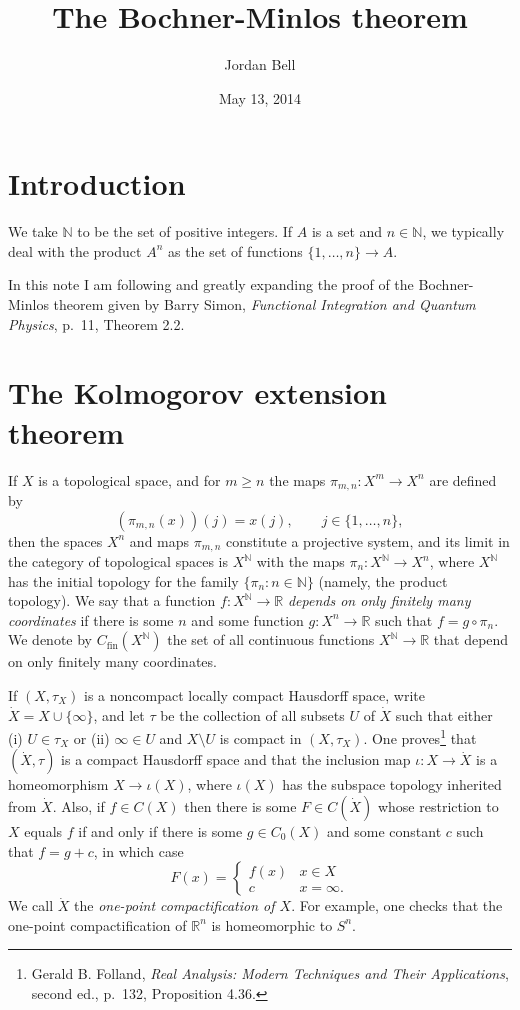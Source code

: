\documentclass{article}
\theoremstyle{definition}
\theoremstyle{definition}
\begin{document}
\title{The Bochner-Minlos theorem}
\author{Jordan Bell}
\date{May 13, 2014}

\maketitle

\section{Introduction}
We take $\mathbb{N}$ to be the set of positive integers.
 If $A$ is a set and $n \in \mathbb{N}$, we typically deal with the product $A^n$ as the set of functions $\{1,\ldots,n\} \to A$.

In this note I am following and greatly expanding the proof of the Bochner-Minlos theorem given by Barry Simon, {\em Functional Integration and Quantum Physics}, p.~11, Theorem 2.2.

\section{The Kolmogorov extension theorem}
If $X$ is a topological space,  and  for $m \geq n$ the maps $\pi_{m,n}:X^m \to X^n$ are defined by
\[
(\pi_{m,n}(x))(j)=
x(j), \qquad j \in \{1,\ldots,n\},
\]
 then the spaces
$X^n$ and maps $\pi_{m,n}$ constitute a projective system, and its  limit in the category of topological spaces is $X^\mathbb{N}$ with the maps $\pi_n:X^\mathbb{N} \to X^n$,
where $X^\mathbb{N}$ has the initial topology for the family $\{\pi_n: n \in \mathbb{N}\}$ (namely,  the product topology).
We say that a function $f:X^\mathbb{N} \to \mathbb{R}$ {\em depends on only finitely many coordinates} if there is some $n$ and some function $g:X^n \to \mathbb{R}$ such that
$f=g \circ \pi_n$. We denote by
$C_{\mathrm{fin}}(X^\mathbb{N})$ the set of all continuous functions $X^\mathbb{N} \to \mathbb{R}$ that depend on only finitely many coordinates.


If $(X,\tau_X)$ is a noncompact locally compact Hausdorff space, write $\dot{X}=X \cup \{\infty\}$, and let $\tau$ be the collection of all subsets $U$ of $\dot{X}$ such that
either (i) $U \in \tau_X$ or (ii) $\infty \in U$ and $X \setminus U$ is compact in $(X,\tau_X)$.
One proves\footnote{Gerald B. Folland,
{\em Real Analysis: Modern Techniques and Their Applications}, second ed., p.~132, Proposition 4.36.} that 
$(\dot{X},\tau)$ is a compact Hausdorff space and that the inclusion map $\iota:X \to \dot{X}$ is a homeomorphism $X \to \iota(X)$, where
$\iota(X)$ has the subspace topology inherited from $\dot{X}$. Also, if $f \in C(X)$ then there is some $F \in C(\dot{X})$ whose restriction
to $X$ equals $f$ if and only if there is some $g \in C_0(X)$ and some constant $c$ such that $f=g+c$, in which case
\[
F(x) = \begin{cases}
f(x)&x \in X\\
c&x=\infty.
\end{cases}
\]
We call $\dot{X}$ the {\em one-point compactification of $X$}. For example, one checks that the one-point compactification of $\mathbb{R}^n$ is homeomorphic
to $S^n$. 
\end{document}
